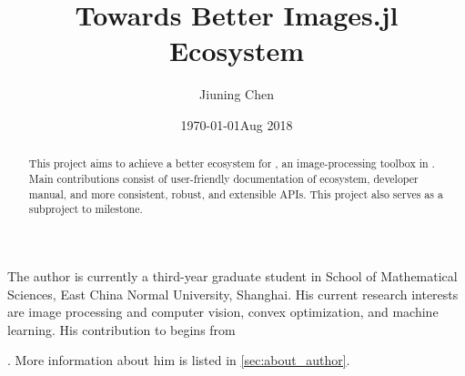 \documentclass[12pt, a4paper]{article}
\title{\huge Towards Better Images.jl Ecosystem}
\author{Jiuning Chen\mailto{johnnychen94@hotmail.com}}
\affil{Github: \href{https://github.com/johnnychen94}{Johnnychen94} \quad Slack: Johnny Chen\\
Mentors: \zygmunt, \julio, \timholy}
\date{\today}
\begin{document}
\maketitle

\begin{abstract}
    This project aims to achieve a better ecosystem for \href{https://juliaimages.org/latest/}{\images}, an image-processing toolbox in \href{https://julialang.org/}{\langjulia}. Main contributions consist of user-friendly documentation of \images{} ecosystem, developer manual, and more consistent, robust, and extensible APIs. This project also serves as a subproject to \images{}  milestone.
\end{abstract}

\noindent The author is currently a third-year graduate student in School of Mathematical Sciences, East China Normal University, Shanghai. His current research interests are image processing and computer vision, convex optimization, and machine learning. His contribution to \images{} begins from \date{Aug 2018}. More information about him is listed in \cref{sec:about_author}.\par

\renewcommand\contentsname{Table of Contents}
\tableofcontents

\newpage






\end{document}
